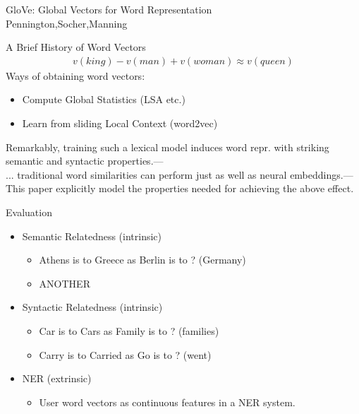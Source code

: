 \begin{frame}
  \begin{center}
    {\huge GloVe: Global Vectors for Word Representation
    } \\
    Pennington,Socher,Manning
  \end{center}
\end{frame}

\begin{frame}{A Brief History of Word Vectors}
  \begin{align*}
    v(king) - v(man) + v(woman) \approx v(queen)
  \end{align*}
  Ways of obtaining word vectors:
  \begin{itemize}
  \item Compute Global Statistics (LSA etc.)
  \item Learn from sliding Local Context (word2vec)
  \end{itemize}
  \footnotesize{Remarkably, training such a lexical model induces word repr. with striking semantic and syntactic properties.}---\cite{Mikolov13a} \\
  \footnotesize{... traditional word similarities can perform just as well as neural embeddings.}---\cite{Levy14}
  This paper explicitly model the properties needed for achieving the above effect.
\end{frame}

\begin{frame}{Evaluation}
  \begin{itemize}
  \item Semantic Relatedness (intrinsic)
    \begin{itemize}
    \item Athens is to Greece as Berlin is to ? (Germany)
    \item ANOTHER
    \end{itemize}
  \item Syntactic Relatedness (intrinsic)
    \begin{itemize}
    \item Car is to Cars as Family is to ? (families)
    \item Carry is to Carried as Go is to ? (went)
    \end{itemize}
  \item NER (extrinsic)
    \begin{itemize}
    \item User word vectors as continuous features in a NER system.
    \end{itemize}
  \end{itemize}
\end{frame}

